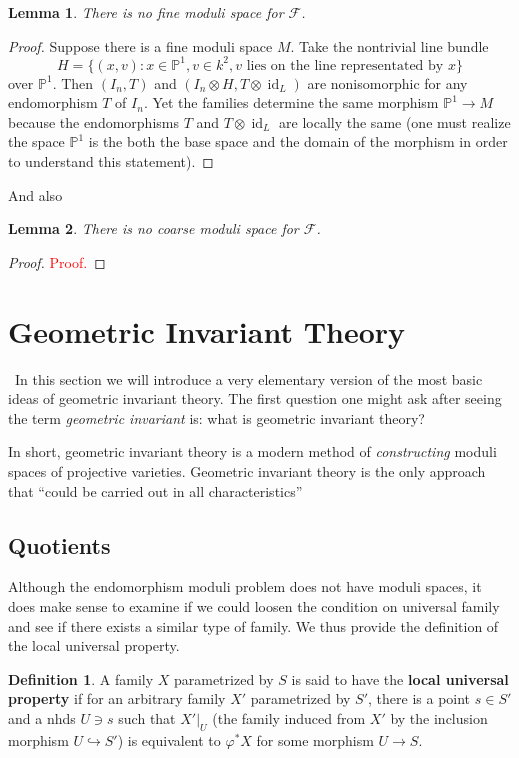 \documentclass[12pt]{article}
\newtheorem{lemma}{Lemma}[section]
\theoremstyle{remark}
\theoremstyle{definition}
\newtheorem{definition}{Definition}[section]
\newcommand{\id}[0]{\operatorname{id}}
\begin{document}
    \begin{lemma}
        There is no fine moduli space for $\mathcal F$.
    \end{lemma}
    \begin{proof}
        Suppose there is a fine moduli space $M$. Take the nontrivial line bundle
        \[H=\{(x, v):x\in\mathbb P^1,v\in k^2,v\mbox{ lies on the line representated by }x\}\] 
        over $\mathbb P^1$. Then $(I_n, T)$ and $(I_n\otimes H, T\otimes \id_L)$ are nonisomorphic for any endomorphism $T$ of $I_n$. Yet the families determine the same morphism $\mathbb P^1\to M$ because the endomorphisms $T$ and $T\otimes\id_L$ are locally the same (one must realize the space $\mathbb P^1$ is the both the base space and the domain of the morphism in order to understand this statement).
    \end{proof}
    And also
    \begin{lemma}
        There is no coarse moduli space for $\mathcal F$.
    \end{lemma}
    \begin{proof}
        \textcolor{red}{Proof.}
    \end{proof}



    \section{Geometric Invariant Theory}\
    In this section we will introduce a very elementary version of the most basic ideas of geometric invariant theory. The first question one might ask after seeing the term \textit{geometric invariant} is: what is geometric invariant theory?

    In short, geometric invariant theory is a modern method of \textit{constructing} moduli spaces of projective varieties. Geometric invariant theory is the only approach that ``could be carried out in all characteristics''
    \subsection{Quotients}
    Although the endomorphism moduli problem does not have moduli spaces, it does make sense to examine if we could loosen the condition on universal family and see if there exists a similar type of family. We thus provide the definition of the local universal property.
    \begin{definition}
        A family $X$ parametrized by $S$ is said to have the \textbf{local universal property} if for an arbitrary family $X'$ parametrized by $S'$, there is a point $s\in S'$ and a nhds $U\ni s$ such that $X'|_U$ (the family induced from $X'$ by the inclusion morphism $U\hookrightarrow S'$) is equivalent to $\varphi^*X$ for some morphism $U\to S$.
    \end{definition}
\end{document}
